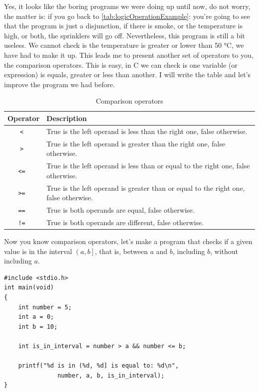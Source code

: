 \documentclass[a4paper]{article}
\newcommand{\centigrade}{°C}
\begin{document}
Yes, it looks like the boring programs we were doing up until now, do not worry,
the matter is: if you go back to \ref{tab:logicOperationExample}:
 you're going to see that the program is just
a disjunction, if there is smoke, or the temperature is high, or both, the
sprinklers will go off. Nevertheless, this program is still a bit useless. We
cannot check is the temperature is greater or lower than 50 \centigrade, we have
had to make it up. This leads me to present another set of operators to you,
the comparison operators. This is easy, in C we can check is one variable
(or expression) is equals, greater or less than another. I will write the
table and let's improve the program we had before.
\begin{table}[H]
\centering
\begin{tabularx}{\linewidth}{|c|Y|}
\hline
\bf Operator & \bf Description \\ \hline
\tt < &   True is the left operand is less than the right one, false otherwise.\\\hline
\tt > &   True is the left operand is greater than the right one, false otherwise.\\\hline
\tt <= &  True is the left operand is less than or equal to the right one, false otherwise. \\\hline
\tt >= &  True is the left operand is greater than or equal to the right one, false otherwise. \\\hline
\tt == &  True is both operands are equal, false otherwise. \\\hline
\tt != &   True is both operands are different, false otherwise. \\\hline
\end{tabularx}
\caption{Comparison operators}
\label{tab:logicOperators}
\end{table}

Now you know comparison operators, let's make a program that checks if a given
value is in the interval $\left(a, b\right]$, that is, between $a$ and $b$,
including $b$, without including $a$.

\noindent
\begin{minipage}[H]{\linewidth}
\mbox{}
\begin{lstlisting}[style=C,
caption={First program with comparison operations},
label={lst:firstComparingProgram}]
#include <stdio.h>
int main(void)
{
    int number = 5;
    int a = 0;
    int b = 10;

    int is_in_interval = number > a && number <= b;

    printf("%d is in (%d, %d] is equal to: %d\n",
               number, a, b, is_in_interval);
}
\end{lstlisting}
\end{minipage}
\end{document}
